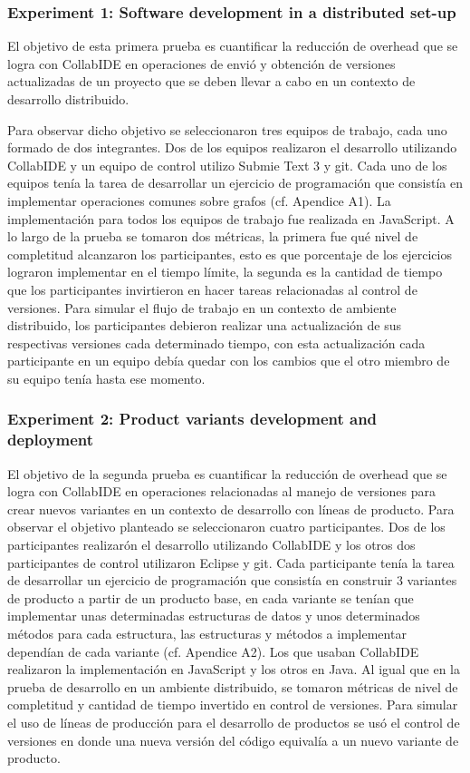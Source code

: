 \subsubsection{Experiment 1: Software development in a distributed set-up}
El objetivo de esta primera prueba es cuantificar la reducción de overhead que se logra con CollabIDE en operaciones de envió y obtención de versiones actualizadas de un proyecto que se deben llevar a cabo en un contexto de desarrollo distribuido. 

Para observar dicho objetivo se seleccionaron tres equipos de trabajo, cada uno formado de dos integrantes. Dos de los equipos realizaron el desarrollo utilizando CollabIDE y un equipo de control utilizo Submie Text 3 y git. Cada uno de los equipos tenía la tarea de desarrollar un ejercicio de programación que consistía en implementar operaciones comunes sobre grafos (cf. Apendice A1). La implementación para todos los equipos de trabajo fue realizada en JavaScript. A lo largo de la prueba se tomaron dos métricas, la primera fue qué nivel de completitud alcanzaron los participantes, esto es que porcentaje de los ejercicios lograron implementar en el tiempo límite, la segunda es la cantidad de tiempo que los participantes invirtieron en hacer tareas relacionadas al control de versiones. Para simular el flujo de trabajo en un contexto de ambiente distribuido, los participantes debieron realizar una actualización de sus respectivas versiones cada determinado tiempo, con esta actualización cada participante en un equipo debía quedar con los cambios que el otro miembro de su equipo tenía hasta ese momento. 

\subsubsection{Experiment 2: Product variants development and deployment}
El objetivo de la segunda prueba es cuantificar la reducción de overhead que se logra con CollabIDE en operaciones relacionadas al manejo de versiones para crear nuevos variantes en un contexto de desarrollo con líneas de producto. Para observar el objetivo planteado se seleccionaron cuatro participantes. Dos de los participantes realizarón el desarrollo utilizando CollabIDE y los otros dos participantes de control utilizaron Eclipse y git. Cada participante tenía la tarea de desarrollar un ejercicio de programación que consistía en construir 3 variantes de producto a partir de un producto base, en cada variante se tenían que implementar unas determinadas estructuras de datos y unos determinados métodos para cada estructura, las estructuras y métodos a implementar dependían de cada variante (cf. Apendice A2). Los que usaban CollabIDE realizaron la implementación en JavaScript y los otros en Java. Al igual que en la prueba de desarrollo en un ambiente distribuido, se tomaron métricas de nivel de completitud y cantidad de tiempo invertido en control de versiones. Para simular el uso de líneas de producción para el desarrollo de productos se usó el control de versiones en donde una nueva versión del código equivalía a un nuevo variante de producto.  

